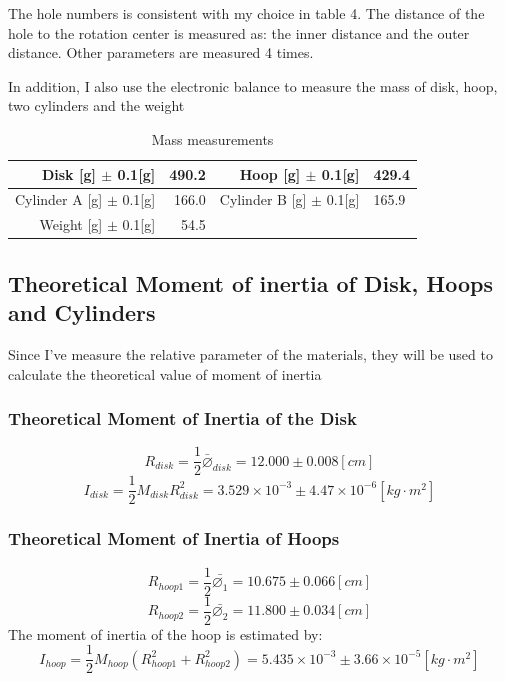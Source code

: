 \documentclass[12pt]{article}
\begin{document}
The hole numbers is consistent with my choice in table 4. The distance of the hole to the rotation center is measured as: the inner distance and the outer distance. Other parameters are measured 4 times.
\par In addition, I also use the electronic balance to measure the mass of disk, hoop, two cylinders and the weight
\begin{table}[H]
\centering
\begin{tabular}{|r||r|r|l|}
\hline
Disk {[}g{]} $\pm$ 0.1{[}g{]}       & 490.2 & Hoop {[}g{]} $\pm$ 0.1{[}g{]}     & 429.4 \\ \hline
Cylinder A {[}g{]} $\pm$ 0.1{[}g{]} & 166.0 & Cylinder B {[}g{]} $\pm$ 0.1{[}g{]} & 165.9 \\ \hline
Weight {[}g{]} $\pm$ 0.1{[}g{]}     & 54.5  &                                   &       \\ \hline
\end{tabular}
\caption{Mass measurements}
\end{table}  
\subsection{Theoretical Moment of inertia of Disk, Hoops and Cylinders }
Since I've measure the relative parameter of the materials, they will be used to calculate the theoretical value of moment of inertia
\subsubsection{Theoretical Moment of Inertia of the Disk}
$$R_{disk}=\frac{1}{2}\bar{\varnothing}_{disk}=12.000\pm0.008[cm]$$
$$I_{disk}=\frac{1}{2}M_{disk}R^2_{disk}=3.529\times10^{-3}\pm4.47\times10^{-6}[kg\cdot{m^2}]$$
\subsubsection{Theoretical Moment of Inertia of Hoops}
$$R_{hoop1}=\frac{1}{2}\bar{\varnothing_1}=10.675\pm0.066[cm]$$
$$R_{hoop2}=\frac{1}{2}\bar{\varnothing_2}=11.800\pm0.034[cm]$$
The moment of inertia of the hoop is estimated by:
$$I_{hoop}=\frac{1}{2}M_{hoop}(R^2_{hoop1}+R^2_{hoop2})=5.435\times10^{-3}\pm3.66\times10^{-5}[kg\cdot{m^2}]$$
\end{document}
